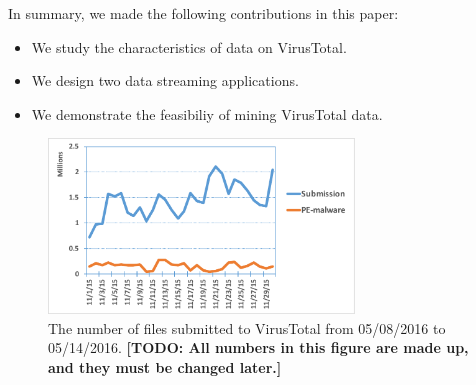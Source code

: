 In summary, we made the following contributions in this paper:

\begin{itemize}

\item We study the characteristics of data on VirusTotal.
\item We design two data streaming applications.
\item We demonstrate the feasibiliy of mining VirusTotal data. 

\end{itemize}


\begin{figure}[t!]
\begin{center}
\includegraphics[width=3.2in]{figure/submission_number}
\caption{The number of files submitted to VirusTotal from 05/08/2016 to 05/14/2016. 
{\bf [TODO: All numbers in this figure are made up, and they must be changed later.]}}
\label{fig:subnum}
\end{center}
\end{figure}
